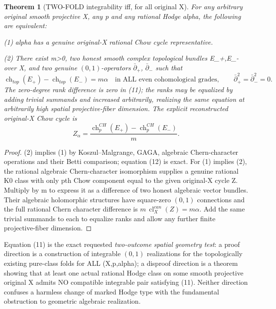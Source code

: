 \documentclass[11pt]{article}
\newtheorem{theorem}{Theorem}
\begin{document}
\begin{theorem}[TWO-FOLD integrability iff, for all original X]
For any arbitrary original smooth projective X,
any p and any rational Hodge alpha, the
following are equivalent:

(1) alpha has a genuine original-X rational Chow
cycle representative.

(2) There exist m>0, two honest smooth complex
topological bundles E_+,E_- over X, and
two genuine $(0,1)$-operators $\bar\partial_+$,
$\bar\partial_-$ such that
\[
 \boxed{
 \operatorname{ch}_{top}(E_+)
  -\operatorname{ch}_{top}(E_-)=m\alpha
 \quad\text{in ALL even cohomological grades},
 \qquad
 \bar\partial_+^2=\bar\partial_-^2=0.
 }                                                        \tag{11}
\]
The zero-degree rank difference is zero in (11);
the ranks may be equalized by adding trivial
summands and increased arbitrarily, realizing
the same equation at arbitrarily high spatial
projective-fiber dimension.
The explicit reconstructed original-X Chow
cycle is
\[
 \boxed{
 Z_\alpha=\frac{
 \operatorname{ch}^{CH}_p(E_+)
 -\operatorname{ch}^{CH}_p(E_-)}{m}.}              \tag{12}
\]
\end{theorem}
\begin{proof}
(2) implies (1) by Koszul--Malgrange, GAGA,
algebraic Chern-character operations and their
Betti comparison; equation (12) is exact.
For (1) implies (2), the rational algebraic
Chern-character isomorphism supplies a genuine
rational K0 class with only pth Chow component
equal to the given original-X cycle Z.
Multiply by m to express it as a difference
of two honest algebraic vector bundles.
Their algebraic holomorphic structures have
square-zero $(0,1)$ connections and the
full rational Chern character difference is
$m\,\operatorname{cl}_X^{can}(Z)=m\alpha$.
Add the same trivial summands to each to
equalize ranks and allow any further
finite projective-fiber dimension.
\end{proof}

Equation (11) is the exact requested
\emph{two-outcome spatial geometry test}:
a proof direction is a construction of
integrable $(0,1)$ realizations for the
topologically existing pure-class folds
for ALL (X,p,alpha);
a disproof direction is a theorem showing
that at least one actual rational Hodge
class on some smooth projective original X
admits NO compatible integrable pair
satisfying (11). Neither direction
confuses a harmless change of marked Hodge
type with the fundamental obstruction
to geometric algebraic realization.
\end{document}
